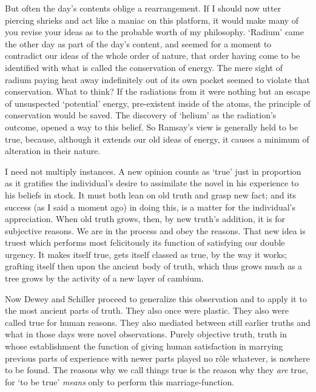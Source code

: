But often the day's contents oblige a rearrangement. If I should now
utter piercing shrieks and act like a maniac on this platform, it
would make many of you revise your ideas as to the probable worth of
my philosophy. `Radium' came the other day as part of the day's
content, and seemed for a moment to contradict our ideas of the whole
order of nature, that  order having come to be identified
with what is called the conservation of energy. The mere sight of
radium paying heat away indefinitely out of its own pocket seemed to
violate that conservation. What to think? If the radiations from it
were nothing but an escape of unsuspected `potential' energy,
pre-existent inside of the atoms, the principle of conservation would
be saved. The discovery of `helium' as the radiation's outcome, opened
a way to this belief. So Ramsay's view is generally held to be true,
because, although it extends our old ideas of energy, it causes a
minimum of alteration in their nature.

I need not multiply instances. A new opinion counts as `true' just in
proportion as it gratifies the individual's desire to assimilate the
novel in his experience to his beliefs in stock. It must both lean on
old truth and grasp new fact; and its success (as I said a moment ago)
in doing this, is a matter for the individual's appreciation. When old
truth grows, then, by new truth's addition, it is for subjective
reasons. We are in the process and obey the reasons. That 
new idea is truest which performs most felicitously its function of
satisfying our double urgency. It makes itself true, gets itself
classed as true, by the way it works; grafting itself then upon the
ancient body of truth, which thus grows much as a tree grows by the
activity of a new layer of cambium.

Now Dewey and Schiller proceed to generalize this observation and to
apply it to the most ancient parts of truth. They also once were
plastic. They also were called true for human reasons. They also
mediated between still earlier truths and what in those days were
novel observations. Purely objective truth, truth in whose
establishment the function of giving human satisfaction in marrying
previous parts of experience with newer parts played no r\^ole
whatever, is nowhere to be found. The reasons why we call things true
is the reason why they \textit{are} true, for `to be true'
\textit{means} only to perform this marriage-function.


